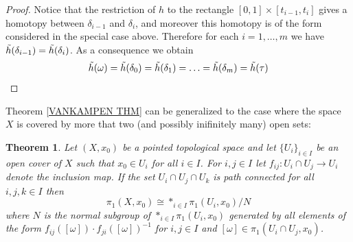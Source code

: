 \documentclass[11pt, letterpaper, oneside]{report}
\theoremstyle{pplain}
\newtheorem{theorem}{Theorem}[chapter]
\theoremstyle{ddefinition}
\theoremstyle{nnn}
\theoremstyle{eexercise}
\newcommand{\ntilde}{\skew{3}\tilde}
\begin{document}
\begin{proof}

Notice that the restriction of $h$ to the rectangle $[0, 1]\times [t_{i-1}, t_{i}]$ gives a homotopy between 
$\delta_{i-1}$ and $\delta_{i}$, and moreover this homotopy is of the form considered in the special 
case above. Therefore for each $i=1, \dots, m$ we have $\ntilde{h}(\delta_{i-1}) = \ntilde{h}(\delta_{i})$.
As a consequence we obtain 
$$\ntilde{h}(\omega) = \ntilde{h}(\delta_{0}) = \ntilde{h}(\delta_{1}) = {\dots} = \ntilde{h}(\delta_{m}) = 
\ntilde{h}(\tau)$$

\end{proof}


Theorem \ref{VANKAMPEN THM} can be generalized to the case where the space $X$ 
is covered by more that two (and possibly inifinitely many) open sets:


\begin{theorem}
\label{GENVANK THM}
Let $(X, x_{0})$ be a pointed topological space and let $\{U_{i}\}_{i\in I}$ be an open cover of $X$ such that 
$x_{0}\in U_{i}$ for all $i\in I$. For $i, j\in I$ let $f_{ij}\colon U_{i}\cap U_{j} \to U_{i}$ denote the inclusion
map.  If the set $U_{i} \cap U_{j} \cap U_{k}$ is path connected 
for all $i, j, k\in I$ then 
$$\pi_{1}(X, x_{0}) \cong \ast_{i\in I} \pi_{1}(U_{i}, x_{0})/N$$
where $N$ is the normal subgroup of $\ast_{i\in I} \pi_{1}(U_{i}, x_{0})$ generated by all elements 
of the form $f_{ij}([\omega])\cdot f_{ji}([\omega])^{-1}$ for $i, j\in I$ and 
$[\omega]\in \pi_{1}(U_{i}\cap U_{j}, x_{0})$.
\end{theorem}
\end{document}

